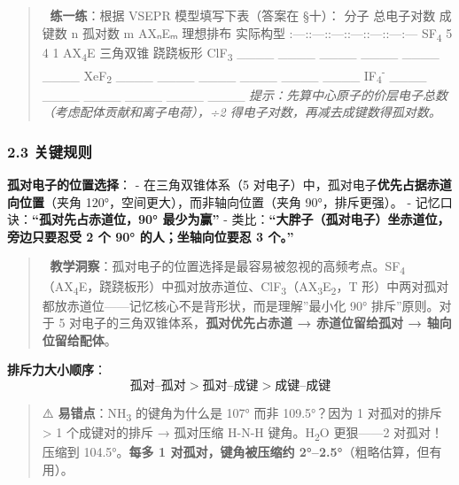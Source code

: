 \documentclass[a4paper,11pt]{ctexart}
\begin{document}
\begin{quote}
📝 \textbf{练一练}：根据 VSEPR 模型填写下表（答案在 §十）：
\textbar{} 分子 \textbar{} 总电子对数 \textbar{} 成键数 n \textbar{} 孤对数 m \textbar{} AXₙEₘ \textbar{} 理想排布 \textbar{} 实际构型 \textbar{}
\textbar:---:\textbar:---:\textbar:---:\textbar:---:\textbar:---:\textbar:---\textbar:---\textbar{}
\textbar{} SF\textsubscript{4} \textbar{} 5 \textbar{} 4 \textbar{} 1 \textbar{} AX\textsubscript{4}E \textbar{} 三角双锥 \textbar{} 跷跷板形 \textbar{}
\textbar{} ClF\textsubscript{3} \textbar{} \_\_\_\_ \textbar{} \_\_\_\_ \textbar{} \_\_\_\_ \textbar{} \_\_\_\_ \textbar{} \_\_\_\_ \textbar{} \_\_\_\_ \textbar{}
\textbar{} XeF\textsubscript{2} \textbar{} \_\_\_\_ \textbar{} \_\_\_\_ \textbar{} \_\_\_\_ \textbar{} \_\_\_\_ \textbar{} \_\_\_\_ \textbar{} \_\_\_\_ \textbar{}
\textbar{} IF\textsubscript{4}\textsuperscript{-} \textbar{} \_\_\_\_ \textbar{} \_\_\_\_ \textbar{} \_\_\_\_ \textbar{} \_\_\_\_ \textbar{} \_\_\_\_ \textbar{} \_\_\_\_ \textbar{}
\emph{提示：先算中心原子的价层电子总数（考虑配体贡献和离子电荷），÷2 得电子对数，再减去成键数得孤对数。}
\end{quote}

\subsubsection{2.3 关键规则}\label{ux5173ux952eux89c4ux5219}

\textbf{孤对电子的位置选择}：
- 在三角双锥体系（5 对电子）中，孤对电子\textbf{优先占据赤道向位置}（夹角 120°，空间更大），而非轴向位置（夹角 90°，排斥更强）。
- 记忆口诀：\textbf{``孤对先占赤道位，90° 最少为赢''}
- 类比：\textbf{``大胖子（孤对电子）坐赤道位，旁边只要忍受 2 个 90° 的人；坐轴向位要忍 3 个。''}

\begin{quote}
🧠 \textbf{教学洞察}：孤对电子的位置选择是最容易被忽视的高频考点。SF\textsubscript{4}（AX\textsubscript{4}E，跷跷板形）中孤对放赤道位、ClF\textsubscript{3}（AX\textsubscript{3}E\textsubscript{2}，T 形）中两对孤对都放赤道位------记忆核心不是背形状，而是理解''最小化 90° 排斥''原则。对于 5 对电子的三角双锥体系，\textbf{孤对优先占赤道 → 赤道位留给孤对 → 轴向位留给配体}。
\end{quote}

\textbf{排斥力大小顺序}：
\[
\text{孤对–孤对} > \text{孤对–成键} > \text{成键–成键}
\]

\begin{quote}
⚠️ \textbf{易错点}：NH\textsubscript{3} 的键角为什么是 107° 而非 109.5°？因为 1 对孤对的排斥 \textgreater{} 1 个成键对的排斥 → 孤对压缩 H-N-H 键角。H\textsubscript{2}O 更狠------2 对孤对！压缩到 104.5°。\textbf{每多 1 对孤对，键角被压缩约 2°--2.5°}（粗略估算，但有用）。
\end{quote}
\end{document}
